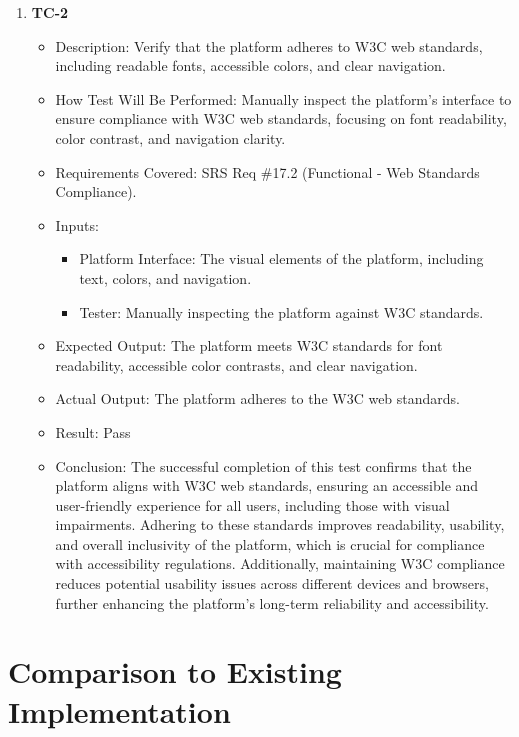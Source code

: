 \documentclass[12pt, titlepage]{article}
\begin{document}
\begin{enumerate}
    \item \textbf{TC-2}  
    \begin{itemize}
        \item Description: Verify that the platform adheres to W3C web standards, including readable fonts, accessible colors, and clear navigation.
        \item How Test Will Be Performed: Manually inspect the platform's interface to ensure compliance with W3C web standards, focusing on font readability, color contrast, and navigation clarity.
        \item Requirements Covered: SRS Req \#17.2 (Functional - Web Standards Compliance).
        \item Inputs:  
            \begin{itemize}
                \item Platform Interface: The visual elements of the platform, including text, colors, and navigation.
                \item Tester: Manually inspecting the platform against W3C standards.
            \end{itemize}
        \item Expected Output: The platform meets W3C standards for font readability, accessible color contrasts, and clear navigation.
        \item Actual Output: The platform adheres to the W3C web standards.
        \item Result: Pass
        \item Conclusion: The successful completion of this test confirms that the platform aligns with W3C web standards,
		ensuring an accessible and user-friendly experience for all users, including those with visual impairments.
		Adhering to these standards improves readability, usability, and overall inclusivity of the platform,
		which is crucial for compliance with accessibility regulations. Additionally,
		maintaining W3C compliance reduces potential usability issues across different devices and browsers,
		further enhancing the platform's long-term reliability and accessibility.
    \end{itemize}

\end{enumerate}
	
\section{Comparison to Existing Implementation}	
\end{document}
